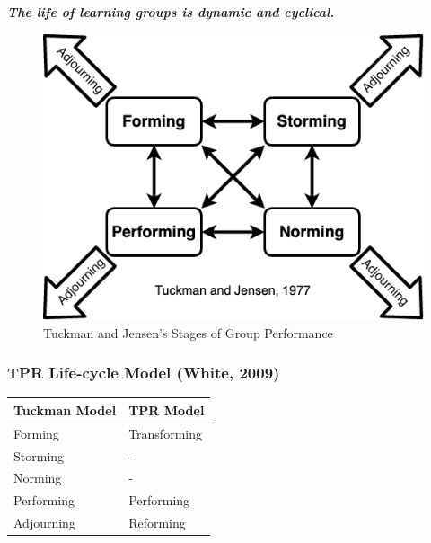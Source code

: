 \documentclass[
]{book}
\begin{document}
\begin{reflect}
\textbf{\emph{The life of learning groups is dynamic and cyclical.}}
\end{reflect}

\begin{figure}
\centering
\includegraphics{assets/presentations/facilitation/tuckman-jensen.drawio.png}
\caption{Tuckman and Jensen's Stages of Group Performance}
\end{figure}

\hypertarget{tpr-life-cycle-model-white-2009}{%
\subsubsection*{TPR Life-cycle Model (White, 2009)}\label{tpr-life-cycle-model-white-2009}}

\begin{longtable}[]{@{}ll@{}}
\toprule\noalign{}
Tuckman Model & TPR Model \\
\midrule\noalign{}
\endhead
\bottomrule\noalign{}
\endlastfoot
Forming & Transforming \\
Storming & - \\
Norming & - \\
Performing & Performing \\
Adjourning & Reforming \\
\end{longtable}
\end{document}
